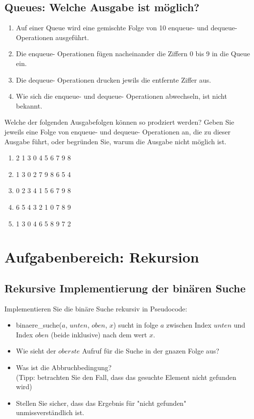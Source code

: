 \documentclass{article}
\begin{document}
\newpage
\subsection{Queues: Welche Ausgabe ist möglich?}
\begin{enumerate}[label=$\bullet$]
    \item Auf einer Queue wird eine gemischte Folge von 10 enqueue- und dequeue- Operationen ausgeführt.
    \item Die enqueue- Operationen fügen nacheinander die Ziffern 0 bis 9 in die Queue ein.
    \item Die dequeue- Operationen drucken jewils die entfernte Ziffer aus.
    \item Wie sich die enqueue- und dequeue- Operationen abwechseln, ist nicht bekannt.
\end{enumerate}
Welche der folgenden Ausgabefolgen können so prodziert werden? Geben Sie jeweils eine Folge von enqueue- und dequeue- Operationen an, die zu dieser Ausgabe führt, oder begründen Sie, warum die Ausgabe nicht möglich ist.
\begin{enumerate}[label=$\arabic*)$]
    \item 2 1 3 0 4 5 6 7 9 8
    \item 1 3 0 2 7 9 8 6 5 4
    \item 0 2 3 4 1 5 6 7 9 8
    \item 6 5 4 3 2 1 0 7 8 9
    \item 1 3 0 4 6 5 8 9 7 2
\end{enumerate}

\section{Aufgabenbereich: Rekursion}
\subsection{Rekursive Implementierung der binären Suche}
Implementieren Sie die binäre Suche rekursiv in Pseudocode:
\begin{itemize}
    \item binaere\_suche($a$, $unten$, $oben$, $x$) sucht in folge $a$ zwischen Index $unten$ und Index $oben$ (beide inklusive) nach dem wert $x$.
    \item Wie sieht der $oberste$ Aufruf für die Suche in der gnazen Folge aus?
    \item Was ist die Abbruchbedingung?\\
    (Tipp: betrachten Sie den Fall, dass das gesuchte Element nicht gefunden wird)
    \item Stellen Sie sicher, dass das Ergebnis für "nicht gefunden" \\unmissverständlich ist.
\end{itemize}
\newpage   
\end{document}
